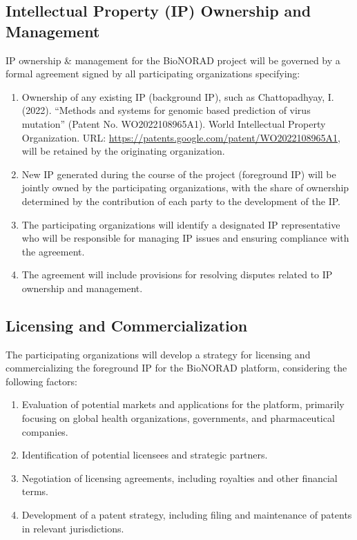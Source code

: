 \documentclass[onecolumn, compsoc,12pt]{IEEEtran}
\begin{document}
\subsection{Intellectual Property (IP) Ownership and Management}
IP ownership \& management for the BioNORAD project will be governed by a formal agreement signed by all participating organizations specifying:
%
\begin{enumerate}
    \item Ownership of any existing IP (background IP), such as Chattopadhyay, I. (2022). ``Methods and systems for genomic based prediction of virus mutation'' (Patent No. WO2022108965A1). World Intellectual Property Organization. URL: \url{https://patents.google.com/patent/WO2022108965A1}, will be retained by the originating organization.
    \item New IP generated during the course of the project (foreground IP) will be jointly owned by the participating organizations, with the share of ownership determined by the contribution of each party to the development of the IP.
    \item The participating organizations will identify a designated IP representative who will be responsible for managing IP issues and ensuring compliance with the agreement.
    \item The  agreement will include provisions for resolving disputes related to IP ownership and management.
\end{enumerate}

\subsection{Licensing and Commercialization}
The participating organizations will develop a strategy for licensing and commercializing the foreground IP for the BioNORAD platform, considering the following factors:
\begin{enumerate}
    \item Evaluation of potential markets and applications for the platform, primarily focusing on global health organizations, governments, and pharmaceutical companies.
    \item Identification of potential licensees and strategic partners.
    \item Negotiation of licensing agreements, including royalties and other financial terms.
    \item Development of a patent strategy, including filing and maintenance of patents in relevant jurisdictions.
\end{enumerate}
\end{document}
